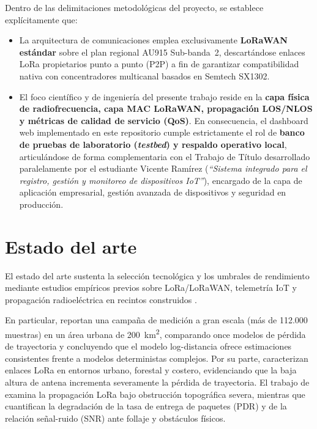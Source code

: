 \documentclass[12pt,oneside,openany,spanish,oldfontcommands]{memoir}
\begin{document}
Dentro de las delimitaciones metodológicas del proyecto, se establece explícitamente que:
\begin{itemize}
    \item La arquitectura de comunicaciones emplea exclusivamente \textbf{LoRaWAN estándar}
    \parencite{lorawan1_0_4} sobre el plan regional AU915 Sub-banda~2, descartándose enlaces LoRa
    propietarios punto a punto (P2P) a fin de garantizar compatibilidad nativa con concentradores
    multicanal basados en Semtech SX1302.
    \item El foco científico y de ingeniería del presente trabajo reside en la \textbf{capa física
    de radiofrecuencia, capa MAC LoRaWAN, propagación LOS/NLOS y métricas de calidad de servicio
    (QoS)}. En consecuencia, el dashboard web implementado en este repositorio cumple estrictamente
    el rol de \textbf{banco de pruebas de laboratorio (\textit{testbed}) y respaldo operativo local},
    articulándose de forma complementaria con el Trabajo de Título desarrollado paralelamente por el
    estudiante Vicente Ramírez (\textit{``Sistema integrado para el registro, gestión y monitoreo de
    dispositivos IoT''}), encargado de la capa de aplicación empresarial, gestión avanzada de
    dispositivos y seguridad en producción.
\end{itemize}

\section{Estado del arte}

El estado del arte sustenta la selección tecnológica y los umbrales de rendimiento mediante
estudios empíricos previos sobre LoRa/LoRaWAN, telemetría IoT y propagación radioeléctrica en
recintos construidos \parencite{rademacher2021,callebaut2020,bianco2021,ahmed2024vegetacion}.

En particular, \textcite{rademacher2021} reportan una campaña de medición a gran escala
(más de 112.000 muestras) en un área urbana de 200~km\textsuperscript{2}, comparando once
modelos de pérdida de trayectoria y concluyendo que el modelo log-distancia ofrece estimaciones
consistentes frente a modelos deterministas complejos. Por su parte, \textcite{callebaut2020}
caracterizan enlaces LoRa en entornos urbano, forestal y costero, evidenciando que la baja altura
de antena incrementa severamente la pérdida de trayectoria. El trabajo de \textcite{bianco2021}
examina la propagación LoRa bajo obstrucción topográfica severa, mientras que
\textcite{ahmed2024vegetacion} cuantifican la degradación de la tasa de entrega de paquetes (PDR)
y de la relación señal-ruido (SNR) ante follaje y obstáculos físicos.
\end{document}
